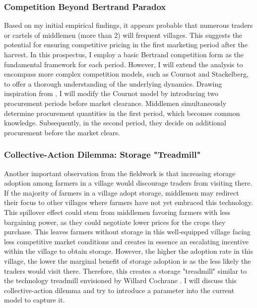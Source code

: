


\subsubsection{Competition Beyond Bertrand Paradox}
\noindent Based on my initial empirical findings, it appears probable that numerous traders or cartels of middlemen (more than 2) will frequent villages. This suggests the potential for ensuring competitive pricing in the first marketing period after the harvest.
In this prospectus, I employ a basic Bertrand competition form as the fundamental framework for each period. However, I will extend the analysis to encompass more complex competition models, such as Cournot and Stackelberg, to offer a thorough understanding of the underlying dynamics. Drawing inspiration from \cite{saloner1987cournot}, I will modify the Cournot model by introducing two procurement periods before market clearance. Middlemen simultaneously determine procurement quantities in the first period, which becomes common knowledge. Subsequently, in the second period, they decide on additional procurement before the market clears.


\subsubsection{Collective-Action Dilemma: Storage "Treadmill"}
\noindent Another important observation from the fieldwork is that increasing storage adoption among farmers in a village would discourage traders from visiting there. If the majority of farmers in a village adopt storage, middlemen may redirect their focus to other villages where farmers have not yet embraced this technology. This spillover effect could stem from middlemen favoring farmers with less bargaining power, as they could negotiate lower prices for the crops they purchase. This leaves farmers without storage in this well-equipped village facing less competitive market conditions and creates in essence an escalating incentive within the village to obtain storage. However, the higher the adoption rate in this village, the lower the marginal benefit of storage adoption is as the less likely the traders would visit there. Therefore, this creates a storage "treadmill" similar to the technology treadmill envisioned by Willard Cochrane \citep{levins1996treadmill, cochrane1958farm}. I will discuss this collective-action dilemma and try to introduce a parameter into the current model to capture it. 


